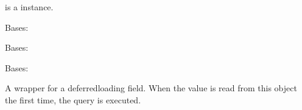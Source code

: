 \documentclass[letterpaper,10pt,spanish]{sphinxmanual}
\begin{document}
\begin{fulllineitems}
\begin{fulllineitems}
\sphinxAtStartPar
{} is a  instance.

\end{fulllineitems}



\begin{fulllineitems}

\pysigstartsignatures
{}
\pysigstopsignatures
\end{fulllineitems}


\end{fulllineitems}



\begin{fulllineitems}

\pysigstartsignatures
{}
\pysigstopsignatures
\sphinxAtStartPar
Bases: 


\begin{fulllineitems}

\pysigstartsignatures
{}
\pysigstopsignatures
\sphinxAtStartPar
Bases: 

\end{fulllineitems}



\begin{fulllineitems}

\pysigstartsignatures
{}
\pysigstopsignatures
\sphinxAtStartPar
Bases: 

\end{fulllineitems}



\begin{fulllineitems}

\pysigstartsignatures
{}
\pysigstopsignatures
\sphinxAtStartPar
A wrapper for a deferred\sphinxhyphen{}loading field. When the value is read from this
object the first time, the query is executed.


\end{fulllineitems}
\end{fulllineitems}
\end{document}
